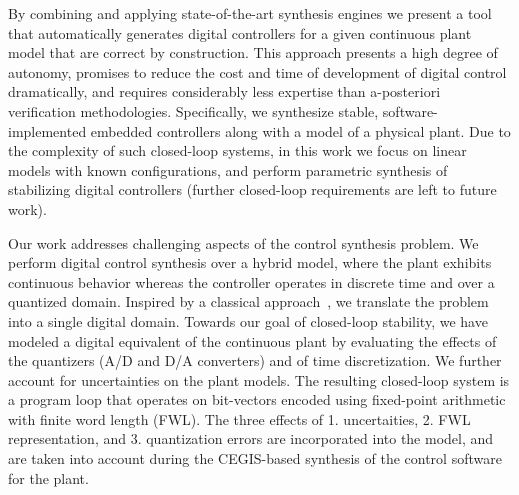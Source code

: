 \documentclass[final]{sig-alternate-05-2015}
\begin{document}
By combining and applying state-of-the-art synthesis engines we present a 
tool that automatically generates digital controllers for a given 
continuous plant model that are correct by construction.  
This approach presents a high degree of autonomy, 
promises to reduce the cost and time of development of digital control dramatically, 
and requires considerably less expertise than a-posteriori verification methodologies.   
Specifically, we synthesize stable,  
software-implemented embedded controllers along with a model of a physical plant. 
Due to the complexity of such closed-loop systems, in this work we focus
on linear models with known configurations, and perform parametric synthesis
of stabilizing digital controllers (further closed-loop requirements are left to future work). 

Our work addresses challenging aspects of the control synthesis problem.  We
perform digital control synthesis over a hybrid model, where the plant
exhibits continuous behavior whereas the controller operates in discrete
time and over a quantized domain.  Inspired by a classical
approach~\cite{astrom1997computer}, we translate the problem into a single
digital domain.  
Towards our goal of closed-loop stability, 
we have modeled a digital equivalent of the continuous plant by evaluating the effects of the quantizers (A/D and D/A converters) and of time
discretization. 
We further account for uncertainties on the plant models. 
The resulting closed-loop system is a program loop that operates on bit-vectors encoded using
fixed-point arithmetic with finite word length (FWL).  
The three effects of 1. uncertaities, 2. FWL representation, and 3. quantization errors are incorporated into the model, 
and are taken into account during the CEGIS-based synthesis of the control software for the plant.
\end{document}
